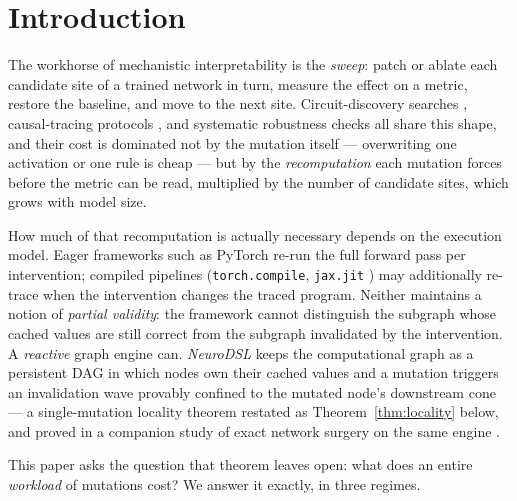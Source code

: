 \documentclass[11pt,a4paper]{article}
\begin{document}
\section{Introduction}

The workhorse of mechanistic interpretability is the \emph{sweep}: patch or ablate each candidate site of a trained network in turn, measure the effect on a metric, restore the baseline, and move to the next site. Circuit-discovery searches \cite{conmy2023}, causal-tracing protocols \cite{meng2022}, and systematic robustness checks all share this shape, and their cost is dominated not by the mutation itself --- overwriting one activation or one rule is cheap --- but by the \emph{recomputation} each mutation forces before the metric can be read, multiplied by the number of candidate sites, which grows with model size.

How much of that recomputation is actually necessary depends on the execution model. Eager frameworks such as PyTorch \cite{pytorch} re-run the full forward pass per intervention; compiled pipelines (\texttt{torch.compile}, \texttt{jax.jit} \cite{jax}) may additionally re-trace when the intervention changes the traced program. Neither maintains a notion of \emph{partial validity}: the framework cannot distinguish the subgraph whose cached values are still correct from the subgraph invalidated by the intervention. A \emph{reactive} graph engine can. \emph{NeuroDSL} \cite{neurodsl} keeps the computational graph as a persistent DAG in which nodes own their cached values and a mutation triggers an invalidation wave provably confined to the mutated node's downstream cone --- a single-mutation locality theorem restated as Theorem~\ref{thm:locality} below, and proved in a companion study of exact network surgery on the same engine \cite{surgery}.

This paper asks the question that theorem leaves open: what does an entire \emph{workload} of mutations cost? We answer it exactly, in three regimes.
\end{document}

